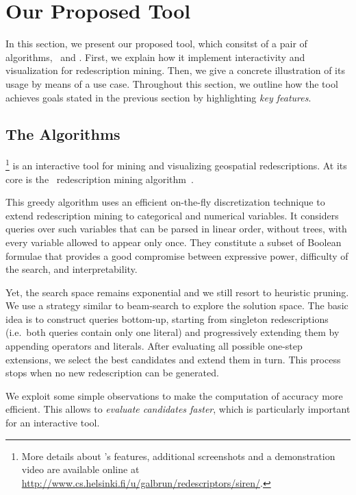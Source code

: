 \section{Our Proposed Tool}
In this section, we present our proposed tool, which consitst of a pair of
algorithms, \ReReMi\ and \Siren. First, we explain how it implement
interactivity and visualization for redescription mining.  Then, we
give a concrete illustration of its usage by means of a
use case. Throughout this section, we outline how the tool achieves
goals stated in the previous section by highlighting \emph{key features}.

\subsection{The Algorithms}
\label{sec:algorithms}

\Siren\footnote{More details about \Siren's features, additional
  screenshots and a demonstration video are available online at
  \url{http://www.cs.helsinki.fi/u/galbrun/redescriptors/siren/}.}  is
an interactive tool for mining and visualizing geospatial
redescriptions. At its core is the \ReReMi\ redescription mining
algorithm~\cite{galbrun11black,galbrun12black}.

This greedy algorithm
uses an efficient on-the-fly discretization technique to extend
redescription mining to categorical and numerical variables.
It considers queries over such variables that can be parsed in linear
order, without trees, with every variable allowed to appear only once.
They constitute a subset of Boolean formulae that
provides a good compromise between expressive power, difficulty of the
search, and interpretability.

Yet, the search space remains exponential and we still resort to
heuristic pruning.  We use a strategy similar to
beam-search to explore the solution space.  The basic idea is to
construct queries bottom-up, starting from singleton redescriptions
(i.e.\ both queries contain only one literal) and progressively
extending them by appending operators and
literals. %
After evaluating all possible one-step extensions, we select the best
candidates and extend them in turn. This process stops when no new
redescription can be generated.

We exploit some simple observations to make the computation of
accuracy more efficient. This allows to \emph{evaluate candidates faster},
which is particularly important for an interactive tool.  

